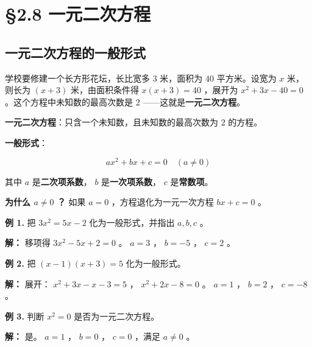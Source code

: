 \chapter{§2.8 一元二次方程}
\label{sec:2.8}





\section*{一元二次方程的一般形式}


\begin{explore}


学校要修建一个长方形花坛，长比宽多 $3$ 米，面积为 $40$ 平方米。设宽为 $x$ 米，则长为 $(x + 3)$ 米，由面积条件得 $x(x + 3) = 40$ ，展开为 $x^2 + 3x - 40 = 0$ 。这个方程中未知数的最高次数是 $2$ ——这就是\textbf{一元二次方程}。

\end{explore}

\begin{understand}


\textbf{一元二次方程}：只含一个未知数，且未知数的最高次数为 $2$ 的方程。

\textbf{一般形式}：

\[
ax^2 + bx + c = 0 \quad (a \neq 0)
\]


其中 $a$ 是\textbf{二次项系数}， $b$ 是\textbf{一次项系数}， $c$ 是\textbf{常数项}。

\textbf{为什么 $a \neq 0$ ？} 如果 $a = 0$ ，方程退化为一元一次方程 $bx + c = 0$ 。

\end{understand}

\begin{workedexamples}


\textbf{例 1.} 把 $3x^2 = 5x - 2$ 化为一般形式，并指出 $a, b, c$ 。

\textbf{解：} 移项得 $3x^2 - 5x + 2 = 0$ 。 $a = 3$ ， $b = -5$ ， $c = 2$ 。

\textbf{例 2.} 把 $(x-1)(x+3) = 5$ 化为一般形式。

\textbf{解：} 展开： $x^2 + 3x - x - 3 = 5$ ， $x^2 + 2x - 8 = 0$ 。 $a = 1$ ， $b = 2$ ， $c = -8$ 。

\textbf{例 3.} 判断 $x^2 = 0$ 是否为一元二次方程。

\textbf{解：} 是。 $a = 1$ ， $b = 0$ ， $c = 0$ ，满足 $a \neq 0$ 。

\end{workedexamples}

